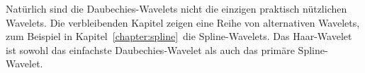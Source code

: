 Natürlich sind die Daubechies-Wavelets nicht die einzigen praktisch
nützlichen Wavelets.
Die verbleibenden Kapitel zeigen eine Reihe von alternativen Wavelets,
zum Beispiel in Kapitel~\ref{chapter:spline} die Spline-Wavelets.
Das Haar-Wavelet ist sowohl das einfachste Daubechies-Wavelet als auch
das primäre Spline-Wavelet.









